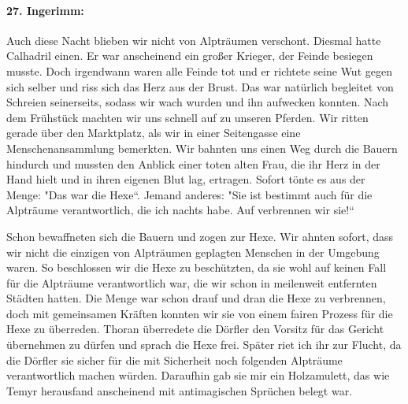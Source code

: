 \documentclass[11pt]{scrreprt}
\begin{document}
\paragraph{27. Ingerimm:}
Auch diese Nacht blieben wir nicht von Alpträumen verschont. Diesmal hatte Calhadril einen. Er war anscheinend ein großer Krieger, der Feinde besiegen musste. Doch irgendwann waren alle Feinde tot und er richtete seine Wut gegen sich selber und riss sich das Herz aus der Brust. Das war natürlich begleitet von Schreien seinerseits, sodass wir wach wurden und ihn aufwecken konnten. Nach dem Frühstück machten wir uns schnell auf zu unseren Pferden. Wir ritten gerade über den Marktplatz, als wir in einer Seitengasse eine Menschenansammlung bemerkten. Wir bahnten uns einen Weg durch die Bauern hindurch und mussten den Anblick einer toten alten Frau, die ihr Herz in der Hand hielt und in ihren eigenen Blut lag, ertragen. Sofort tönte es aus der Menge: "Das war die Hexe“. Jemand anderes: "Sie ist bestimmt auch für die Alpträume verantwortlich, die ich nachts habe. Auf verbrennen wir sie!“ \par

Schon bewaffneten sich die Bauern und zogen zur Hexe. Wir ahnten sofort, dass wir nicht die einzigen von Alpträumen geplagten Menschen in der Umgebung waren. So beschlossen wir die Hexe zu beschützten, da sie wohl auf keinen Fall für die Alpträume verantwortlich war, die wir schon in meilenweit entfernten Städten hatten. Die Menge war schon drauf und dran die Hexe zu verbrennen, doch mit gemeinsamen Kräften konnten wir sie von einem fairen Prozess für die Hexe zu überreden. Thoran überredete die Dörfler den Vorsitz für das Gericht übernehmen zu dürfen und sprach die Hexe frei. Später riet ich ihr zur Flucht, da die Dörfler sie sicher für die mit Sicherheit noch folgenden Alpträume verantwortlich machen würden. Daraufhin gab sie mir ein Holzamulett, das wie Temyr herausfand anscheinend mit antimagischen Sprüchen belegt war.\par
\end{document}
